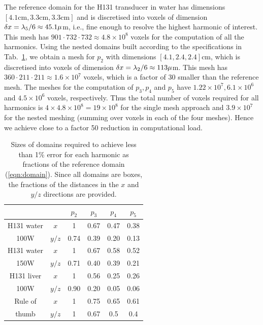 \documentclass[11pt]{article}
\numberwithin{equation}{section}
\newcommand{\red}[1]{{\color{black} #1}}
\begin{document}
The reference domain for the H131 transducer in water has dimensions 
$[4.1\text{cm},3.3\text{cm},3.3\text{cm}]$ and is discretised into voxels of dimension 
$\delta x = \lambda_5/6\approx \red{45.1\mu}$m, i.e., fine enough to 
resolve the highest harmonic of interest. This mesh has 
$901\cdot 732\cdot 732\approx 4.8\times 10^8$ voxels for the computation of all 
the harmonics. Using the nested domains built according to the specifications in 
Tab.~\ref{tab:convergence_domain}, we obtain a mesh for $p_2$ with dimensions
$[4.1, 2.4, 2.4]$cm, which is discretised into voxels of dimension 
$\delta x = \lambda_2/6\approx \red{113\mu}$m. This mesh has 
$360\cdot 211\cdot 211\approx 1.6\times 10^7$ voxels, which is a factor of 
30 smaller than the reference mesh. \red{The meshes for the computation of $p_3, p_4$
and $p_5$ have $1.22\times10^7, 6.1\times10^6$ and $4.5\times10^6$ voxels, respectively.
Thus the total number of voxels required for all harmonics is $4\times4.8\times 10^8=19\times 10^8$ for 
the single mesh approach and $3.9\times 10^7$ for the nested meshing (summing over 
voxels in each of the four meshes). Hence we achieve close to a factor 50 reduction in computational load.}

\begin{table}[h!]
    \centering
    \begin{tabular}{c | c  c  c  c  c}
        \hline\hline
             &     & $p_2$ & $p_3$ & $p_4$ & $p_5$ \\
        \hline
        H131 water & $x$   & 1 & 0.67 & 0.47 & 0.38 \\
        100W & $y/z$ & 0.74 & 0.39 & 0.20 & 0.13 \\
        \hline
        H131 water & $x$   & 1 & 0.67 & 0.58 & 0.52 \\
        150W & $y/z$ & 0.71 & 0.40 & 0.39 & 0.21 \\
        \hline
        H131 liver & $x$   & 1 & 0.56 & 0.25 & 0.26 \\
        100W & $y/z$ & 0.90 & 0.20 & 0.05 & 0.06 \\
        \hline
        Rule of & $x$  &  1 & 0.75 & 0.65 & 0.61 \\
        thumb   & $y/z$ & 1 & 0.67 & 0.5 & 0.4
    \end{tabular}
    \caption{Sizes of domains required to achieve less than 1\% error for each 
    harmonic as fractions of the reference domain (\ref{eqn:domain}). Since all 
    domains are boxes, the fractions of the distances in the $x$ and $y/z$ directions 
    are provided.}
    \label{tab:convergence_domain}
\end{table}
\end{document}

